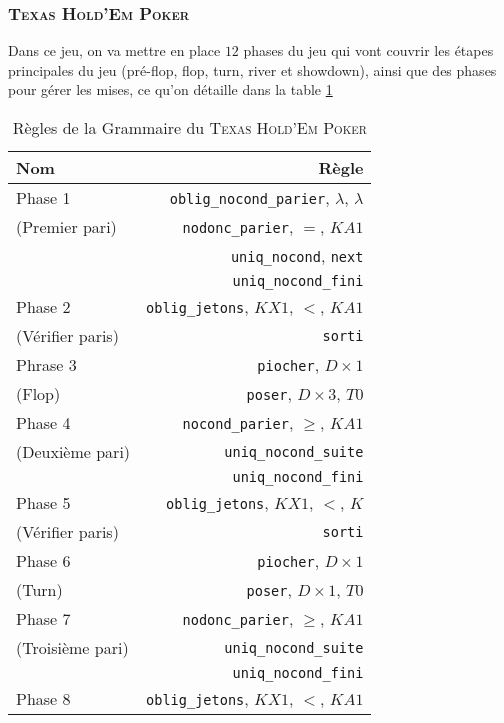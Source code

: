 \documentclass{cours}
\begin{document}
\subsubsection{\textsc{Texas Hold'Em Poker}}
Dans ce jeu, on va mettre en place $12$ phases du jeu qui vont couvrir les étapes principales du jeu (pré-flop, flop, turn, river et showdown), ainsi que des phases pour gérer les mises, ce qu'on détaille dans la table \ref{table:grammar_poker}
\begin{table}
    \centering
    \caption{Règles de la Grammaire du \textsc{Texas Hold'Em Poker}}
    \label{table:grammar_poker}
    \begin{tabular}{lr}
        \toprule
        Nom & Règle \\
        \midrule
        Phase 1 & \texttt{oblig\_nocond\_parier}, $\lambda$, $\lambda$\\
        (Premier pari) & \texttt{nodonc\_parier}, $=$, $KA1$\\
        & \texttt{uniq\_nocond}, \texttt{next}\\
        & \texttt{uniq\_nocond\_fini}\\
        \midrule
        Phase 2 & \texttt{oblig\_jetons}, $KX1$, $<$, $KA1$\\
        (Vérifier paris) & \texttt{sorti}\\
        \midrule
        Phrase 3 & \texttt{piocher}, $D \times 1$\\
        (Flop) & \texttt{poser}, $D\times 3$, $T0$\\
        \midrule
        Phase 4 & \texttt{nocond\_parier}, $\geq$, $KA1$\\
        (Deuxième pari) & \texttt{uniq\_nocond\_suite}\\
        & \texttt{uniq\_nocond\_fini}\\
        \midrule
        Phase 5 & \texttt{oblig\_jetons}, $KX1$, $<$, $K$\\
        (Vérifier paris) & \texttt{sorti}\\
        \midrule
        Phase 6 & \texttt{piocher}, $D \times 1$\\       
        (Turn) & \texttt{poser}, $D\times 1$, $T0$\\ 
        \midrule
        Phase 7 & \texttt{nodonc\_parier}, $\geq$, $KA1$\\
        (Troisième pari) & \texttt{uniq\_nocond\_suite}\\
        & \texttt{uniq\_nocond\_fini}\\
        \midrule
        Phase 8 & \texttt{oblig\_jetons}, $KX1$, $<$, $KA1$\\

\end{tabular}
\end{table}
\end{document}
